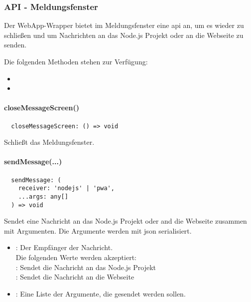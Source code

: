 \subsubsection{API - Meldungsfenster}

Der WebApp-Wrapper bietet im Meldungsfenster eine \ac{api} an, um es wieder zu schließen und um Nachrichten an das Node.js Projekt oder an die Webseite zu senden.

Die folgenden Methoden stehen zur Verfügung:

\begin{itemize}
  \setlength\itemsep{-0.8em}
  \item {}
  \item {}
\end{itemize}


\paragraph{closeMessageScreen()}

\begin{verbatim}
  closeMessageScreen: () => void
\end{verbatim}

Schließt das Meldungsfenster.


\paragraph{sendMessage(...)}

\begin{verbatim}
  sendMessage: (
    receiver: 'nodejs' | 'pwa',
    ...args: any[]
  ) => void
\end{verbatim}

Sendet eine Nachricht an das Node.js Projekt oder and die Webseite zusammen mit Argumenten.
Die Argumente werden mit \ac{json} serialisiert.

\begin{itemize}
  \setlength\itemsep{-0.5em}
  \item {}: Der Empfänger der Nachricht.\\
    \hspace*{1em} Die folgenden Werte werden akzeptiert:\\
    \hspace*{1em}: Sendet die Nachricht an das Node.js Projekt\\
    \hspace*{1em}: Sendet die Nachricht an die Webseite
  \item {}: Eine Liste der Argumente, die gesendet werden sollen.
\end{itemize}
